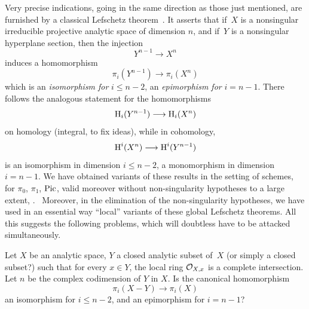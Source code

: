 Very precise indications, going in the same direction as those just mentioned, are furnished by a classical Lefschetz theorem~\cite{XIII.7}. It asserts that if~$X$ is a nonsingular irreducible projective analytic space of dimension $n$, and if~$Y$ is a nonsingular hyperplane section, then the injection
$$Y^{n-1}\to X^n$$
induces a homomorphism
$$
\pi_i(Y^{n-1})\to \pi_i(X^n)$$
which is an \emph{isomorphism for} $i\le n-2$, an \emph{epimorphism for} $i=n-1$. There follows the analogous statement for the homomorphisms
$$
\H_i(Y^{n-1})\to \H_i(X^n)$$
on homology (integral, to fix ideas), while in cohomology,
$$
\H^i(X^n)\to\H^i(Y^{n-1})
$$
is an isomorphism in dimension $i\le n-2$, a monomorphism in dimension $i=n-1$. We have obtained variants of these results in the setting of schemes, for $\pi_0$, $\pi_1$, $\operatorname{Pic}$, valid moreover without non-singularity hypotheses to a large extent, \cf \Exp {}. \ Moreover, in the elimination of the non-singularity hypotheses, we have used in an essential way ``local'' variants of these global Lefschetz theorems. All this suggests the following problems, which will doubtless have to be attacked simultaneously.

\begin{problem} \label{XIII.4.1}
Let $X$ be an analytic space, $Y$ a closed analytic subset of~$X$ (or simply a closed subset?) such that for every $x\in Y$, the local ring $\mathcal{O}_{X, x}$ is a complete intersection. Let $n$ be the complex codimension of $Y$ in $X$. Is the canonical homomorphism
$$
\pi_i(X-Y)\to \pi_i(X)$$
an isomorphism for $i\le n-2$, and an epimorphism for $i=n-1$?
\end{problem}

